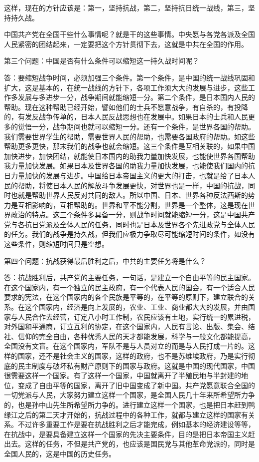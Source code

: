 这样，现在的方针应该是：第一，坚持抗战，第二，坚持抗日统一战线，第三，坚持持久战。

中国共产党在全国干些什么事情呢？就是干的这些事情。中央愿与各党各派及全国人民紧密的团结起来，一定要把这个方针贯彻下去，这就是中共在全国的作用。

第三个问题：中国是否有什么条件可以缩短这一持久战时间呢？

答：要缩短战争时间，必须加强三个条件。第一个条件，是中国的统一战线巩固和扩大，这是基本的，在统一战线的方针下，各项工作须大大的发展与进步，这些工作多发展与多进步一分，战争期间就能缩短一分。第二个条件，是日本国内人民的帮助。现在这种帮助已经开始，譬如他们的士兵不愿意战争，有自杀的，有投降的，有发反战争传单的，日本人民反战思想也在发展中。如果日本的士兵和人民更多的觉悟一分，战争期间也就可以缩短一分。还有一个条件，是世界各国的帮助。我们需要世界学生的帮助，需要世界人民的帮助，也需要各国政府的帮助。如这些帮助更多更快，那末我们的战争也就会缩短。这三个条件是互相关联的，如果中国加快进步，加快团结，就能使日本国内的助我力量加快发展，也能使世界各国帮助我力量加快发展。如果日本及世界各国的助我力量加快发展，也能使我们国内的抗日力量加快的发展与进步。中国给日本帝国主义的更大的打击，也就是给了日本人民的帮助，将使日本人民的解放斗争发展更快，对世界也是一样，中国的抗战，同时也就是帮助世界人民反对共同的敌人。所以中国、日本、世界各种反法西斯的势力是互相影响的，互相帮助的。世界和平不能分割，世界是一个整体，这是现在世界政治的特点。这三个条件多具备一分，则战争时间就能缩短一分，这是中国共产党与各抗日党派及全体人民的任务，同时也是日本及世界各个先进政党与全体人民的任务。我们的战争是持久战，但我们应极力争取尽可能缩短时间的条件，如没有这些条件，则缩短时间只是空想。

第四个问题：抗战获得最后胜利之后，中共的主要任务将是什么？

答：抗战胜利后，共产党的主要任务，一句话，是建立一个自由平等的民主国家。在这个国家内，有一个独立的民主政府，有一个代表人民的国会，有一个适合人民要求的宪法，在这个国家内的各个民族是平等的，在平等的原则下，建立联合的关系。在这个国家内，经济是向上发展的，农业、工业、商业都大大的发展，并由国家与人民合作去经营，订定八小时工作制，农民应该有土地，实行统一的累进税，对外国和平通商，订立互利的协定，在这个国家内，人民有言论、出版、集会、结社、信仰的完全自由，各种优秀人民的天才都能发展，科学与一般文化都能提高，全国没有文盲。在这个国家内，军队不是与人员对立的而是与人民打成一片的。这样的国家，还不是社会主义的国家，这样的政府，也不是苏维埃政府，乃是实行彻底的民主制度与破坏私有财产原则下的国家与政府。这就是中国的现代国家，中国很需要这样一个国家。有了这样一个国家，中国就离开了半殖民地与半封建的地位，变成了自由平等的国家，离开了旧中国变成了新中国。共产党愿意联合全国的一切党派与人民，大家努力建立这样一个国家，是全国人民几十年来所希望所力争的，也是孙中山先生所希望所力争的。进行建立这样一个国家，也是把日本赶到鸭绿江之后的第二天才开始的，抗战过程中的各种工作，就都与建立这样的国家有关系。不过许多重要工作是要在抗战胜利之后才能完成，例如基本的经济建设等等，在抗战中，是要具备建立这样一个国家的先决主要条件，目的是把日本帝国主义赶出去。这样的任务，不但是共产党的，也应该是国民党与其他革命党派的，同时是全国人民的，这是中国的历史任务。

